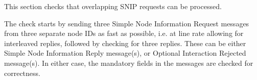 This section checks that overlapping SNIP requests can be processed.

The check starts by sending three Simple Node Information Request messages from three separate node IDs
        as fast as possible, i.e. at line rate allowing for interleaved replies,
        followed by checking for three replies.  
        These can be either 
        Simple Node Information Reply message(s), 
        or Optional Interaction Rejected message(s).  In either
        case, the mandatory fields in the messages are checked for correctness.

  
